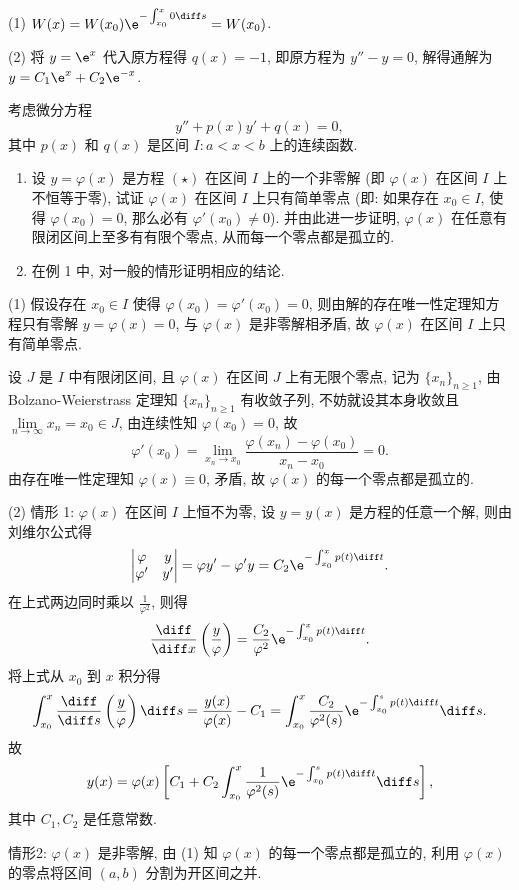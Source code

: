 \begin{solve}
  (1) $W(x)=W(x_0)\e^{-\int_{x_0}^x0\diff s}=W(x_0)$.

  (2) 将 $y=\e^x$ 代入原方程得 $q(x)=-1$, 即原方程为 $y''-y=0$, 解得通解为 $y=C_1\e^x+C_2\e^{-x}$.
\end{solve}



\begin{exercise}
  考虑微分方程
  \begin{equation}
    y''+p(x)y'+q(x)=0, \tag{$\star$}
  \end{equation}
  其中 $p(x)$ 和 $q(x)$ 是区间 $I:a<x<b$ 上的连续函数.
  \begin{enumerate}[(1)]
  \item 设 $y=\varphi(x)$ 是方程 $(\star)$ 在区间 $I$ 上的一个非零解
  (即 $\varphi(x)$ 在区间 $I$ 上不恒等于零), 
  试证 $\varphi(x)$ 在区间 $I$ 上只有简单零点
  (即: 如果存在 $x_0\in I$, 使得 $\varphi(x_0)=0$, 那么必有 $\varphi'(x_0)\neq 0$). 
  并由此进一步证明, $\varphi(x)$ 在任意有限闭区间上至多有有限个零点, 从而每一个零点都是孤立的.
  \item 在例 1 中, 对一般的情形证明相应的结论.
  \end{enumerate}
\end{exercise}

\begin{solve}
  (1) 假设存在 $x_0\in I$ 使得 $\varphi(x_0)=\varphi'(x_0)=0$, 
  则由解的存在唯一性定理知方程只有零解 $y=\varphi(x)=0$, 与 $\varphi(x)$ 是非零解相矛盾, 
  故 $\varphi(x)$ 在区间 $I$ 上只有简单零点.

  设 $J$ 是 $I$ 中有限闭区间, 且 $\varphi(x)$ 在区间 $J$ 上有无限个零点, 记为 $\{x_n\}_{n\geq 1}$, 
  由 Bolzano-Weierstrass 定理知 $\{x_n\}_{n\geq 1}$ 有收敛子列,
  不妨就设其本身收敛且 $\lim\limits_{n\to\infty}x_n=x_0\in J$, 由连续性知 $\varphi(x_0)=0$, 故
  \[\varphi'(x_0)=\lim_{x_n\to x_0}\frac{\varphi(x_n)-\varphi(x_0)}{x_n-x_0}=0.\]
  由存在唯一性定理知 $\varphi(x)\equiv 0$, 矛盾, 故 $\varphi(x)$ 的每一个零点都是孤立的.

  (2) 情形 1: $\varphi(x)$ 在区间 $I$ 上恒不为零, 设 $y=y(x)$ 是方程的任意一个解, 则由刘维尔公式得
  \[\begin{vmatrix}\varphi&y\\\varphi'&y'\end{vmatrix}
    = \varphi y'-\varphi'y=C_2\e^{-\int_{x_0}^xp(t)\diff t}.\]
  在上式两边同时乘以 $\frac{1}{\varphi^2}$, 则得
  \[\frac{\diff}{\diff x}\left(\frac{y}{\varphi}\right)
    = \frac{C_2}{\varphi^2}\e^{-\int_{x_0}^xp(t)\diff t}.\]
  将上式从 $x_0$ 到 $x$ 积分得
  \[\int_{x_0}^x\frac{\diff}{\diff s}\left(\frac{y}{\varphi}\right)\diff s
    = \frac{y(x)}{\varphi(x)}-C_1
    = \int_{x_0}^x\frac{C_2}{\varphi^2(s)}\e^{-\int_{x_0}^sp(t)\diff t}\diff s.\]
  故
  \[y(x) = \varphi(x)\left[C_1+C_2\int_{x_0}^x\frac{1}{\varphi^2(s)}\e^{-\int_{x_0}^sp(t)\diff t}\diff s\right],\]
  其中 $C_1,C_2$ 是任意常数.

  情形2: $\varphi(x)$ 是非零解, 由 (1) 知 $\varphi(x)$ 的每一个零点都是孤立的, 
  利用 $\varphi(x)$ 的零点将区间 $(a,b)$ 分割为开区间之并.
\end{solve}



